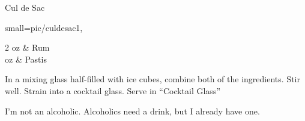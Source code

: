 \begin{recipe}
[ %
    preparationtime = {\unit[2]{min}},
    portion = \portion{1},
    source = \url{http://www.1001cocktails.com/recipes/mixed-drinks/102389/cocktail-cul-de-sac.html}
    ]
{Cul de Sac}
    
    \graph
    {%
        small=pic/culdesac1,
    }
    
    \ingredients
    {%
        2  oz & Rum\\
           oz & Pastis\\
    }
    
    \preparation
    { %
        \step In a mixing glass half-filled with ice cubes, combine both of the ingredients.
        \step Stir well.
        \step Strain into a cocktail glass.
        \step Serve in ``Cocktail Glass''
    }
    
    \hint
    {%
        I'm not an alcoholic. Alcoholics need a drink, but I already have one.
    }

\end{recipe}
